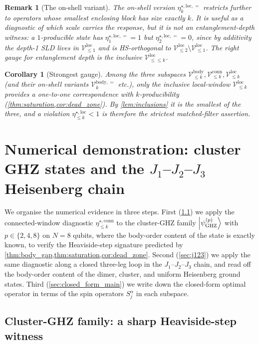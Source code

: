 \documentclass[11pt,a4paper]{article}
\newcommand{\Vbody}[1]{\mathcal{V}^{\mathrm{body}}_{\le #1}}
\newcommand{\Vconn}[1]{\mathcal{V}^{\mathrm{conn}}_{\le #1}}
\newcommand{\Vloc}[1]{\mathcal{V}^{\mathrm{loc}}_{\le #1}}
\newcommand{\etaconn}[1]{\eta^{\star,\mathrm{conn}}_{\le #1}}
\newcommand{\etaloc}[1]{\eta^{\star,\mathrm{loc}}_{\le #1}}
\newcommand{\PsiGHZ}[1]{\ket{\psi^{(#1)}_{\rm GHZ}}}
\newtheorem{corollary}{Corollary}
\newtheorem*{remark}{Remark}
\begin{document}
\begin{remark}[The on-shell variant]
The on-shell version $\eta^{\star,\mathrm{loc},=}_{k}$ restricts
further to operators whose smallest enclosing block has size
\emph{exactly} $k$.  It is useful as a diagnostic of \emph{which
scale carries the response}, but it is \emph{not} an
entanglement-depth witness: a $1$-producible state has
$\eta^{\star,\mathrm{loc},=}_{1}=1$ but
$\eta^{\star,\mathrm{loc},=}_{2}=0$, since by additivity the
depth-1 SLD lives in
$\Vloc{1}$ and is HS-orthogonal to $\Vloc{2}\setminus\Vloc{1}$.
The right gauge for entanglement depth is the inclusive
$\Vloc{\le k}$.
\end{remark}

\begin{corollary}[Strongest gauge]
\label{cor:strongest}
Among the three subspaces $\Vbody{k},\Vconn{k},\Vloc{k}$ (and
their on-shell variants $\mathcal V^{\mathrm{body},=}_k$ etc.),
only the \emph{inclusive} local-window
$\Vloc{k}$ provides a one-to-one correspondence with
$k$-producibility (\cref{thm:saturation,cor:dead_zone}).  By
\cref{lem:inclusions} it is the smallest of the three, and a
violation $\etaloc{k}<1$ is therefore the strictest matched-filter
assertion.
\end{corollary}

\section{Numerical demonstration: cluster GHZ states and the
$J_1$--$J_2$--$J_3$ Heisenberg chain}
\label{sec:numerics}

We organise the numerical evidence in three steps.  First
(\cref{sec:ghz_numerics}) we apply the connected-window diagnostic
$\etaconn{k}$ to the cluster-GHZ family $\PsiGHZ{p}$ with
$p\in\{2,4,8\}$ on $N=8$ qubits, where the body-order content of
the state is exactly known, to verify the Heaviside-step
signature predicted by
\cref{thm:body_gap,thm:saturation,cor:dead_zone}.  Second
(\cref{sec:j123}) we apply the same diagnostic along a closed
three-leg loop in the $J_1$--$J_2$--$J_3$ chain, and read off the
body-order content of the dimer, cluster, and uniform Heisenberg
ground states.  Third (\cref{sec:closed_form_main}) we write down
the closed-form optimal operator in terms of the spin operators
$S^\alpha_j$ in each subspace.

\subsection{Cluster-GHZ family: a sharp Heaviside-step witness}
\label{sec:ghz_numerics}
\end{document}
